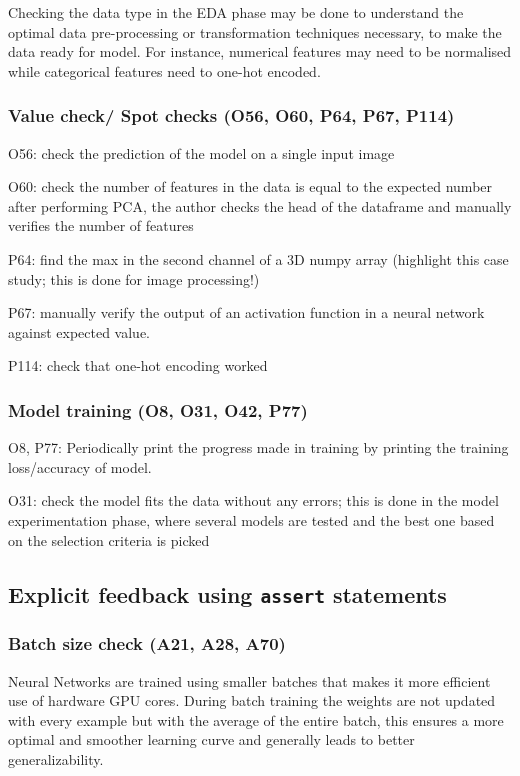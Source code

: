 Checking the data type in the EDA phase may be done to understand the optimal data pre-processing or transformation techniques necessary, to make the data ready for model. For instance, numerical features may need to be normalised while categorical features need to one-hot encoded.

\subsubsection{Value check/ Spot checks (O56, O60, P64, P67, P114)}

O56: check the prediction of the model on a single input image

O60: check the number of features in the data is equal to the expected number after performing PCA, the author checks the head of the dataframe and manually verifies the number of features

P64: find the max in the second channel of a 3D numpy array (highlight this case study; this is done for image processing!)

P67: manually verify the output of an activation function in a neural network against expected value.

P114: check that one-hot encoding worked

\subsubsection{Model training (O8, O31, O42, P77)}

O8, P77: Periodically print the progress made in training by printing the training loss/accuracy of model.

O31: check the model fits the data without any errors; this is done in the model experimentation phase, where several models are tested and the best one based on the selection criteria is picked

\subsection{Explicit feedback using \texttt{assert} statements}

\subsubsection{Batch size check (A21, A28, A70)}

Neural Networks are trained using smaller batches that makes it more efficient use of hardware GPU cores. During batch training the weights are not updated with every example but with the average of the entire batch, this ensures a more optimal and smoother learning curve and generally leads to better generalizability.

